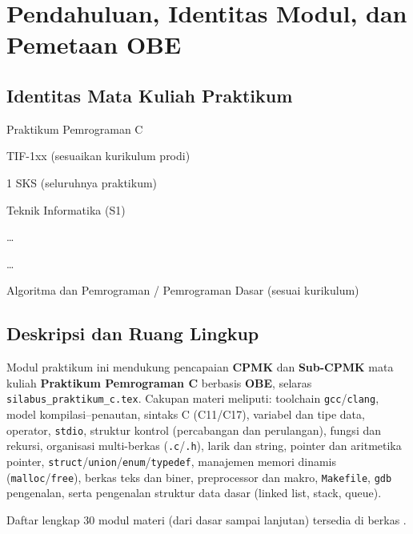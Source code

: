 \documentclass[../main.tex]{subfiles}
\begin{document}
\chapter{Pendahuluan, Identitas Modul, dan Pemetaan OBE}

\section{Identitas Mata Kuliah Praktikum}

\begin{description}[style=nextline, widest=Dosen pengampu / koordinator praktikum:, itemsep=0.35em]
  \item[Nama mata kuliah:] Praktikum Pemrograman C
  \item[Kode:] TIF-1xx (sesuaikan kurikulum prodi)
  \item[Bobot:] 1 SKS (seluruhnya praktikum)
  \item[Program studi:] Teknik Informatika (S1)
  \item[Semester / tahun akademik:] \ldots
  \item[Dosen pengampu / koordinator praktikum:] \ldots
  \item[Prasyarat:] Algoritma dan Pemrograman / Pemrograman Dasar (sesuai kurikulum)
\end{description}

\section{Deskripsi dan Ruang Lingkup}

Modul praktikum ini mendukung pencapaian \textbf{CPMK} dan \textbf{Sub-CPMK} mata kuliah \textbf{Praktikum Pemrograman C} berbasis \textbf{OBE}, selaras \texttt{silabus\_praktikum\_c.tex}. Cakupan materi meliputi: toolchain \texttt{gcc}/\texttt{clang}, model kompilasi--penautan, sintaks C (C11/C17), variabel dan tipe data, operator, \texttt{stdio}, struktur kontrol (percabangan dan perulangan), fungsi dan rekursi, organisasi multi-berkas (\texttt{.c}/\texttt{.h}), larik dan string, pointer dan aritmetika pointer, \texttt{struct}/\texttt{union}/\texttt{enum}/\texttt{typedef}, manajemen memori dinamis (\texttt{malloc}/\texttt{free}), berkas teks dan biner, preprocessor dan makro, \texttt{Makefile}, \texttt{gdb} pengenalan, serta pengenalan struktur data dasar (linked list, stack, queue).

Daftar lengkap 30 modul materi (dari dasar sampai lanjutan) tersedia di berkas .
\end{document}
